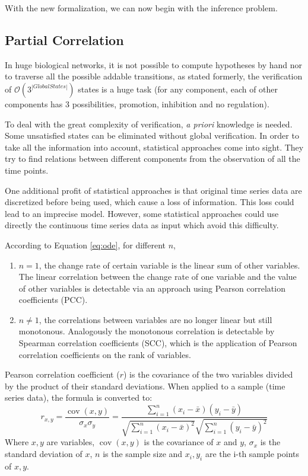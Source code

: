 With the new formalization, we can now begin with the inference problem.


\subsection{Partial Correlation}

In huge biological networks, it is not possible to compute hypotheses by hand nor to traverse all the possible addable transitions, as stated formerly, the verification of $\mathcal{O}(3^{|Global States|})$ states is a huge task (for any component, each of other components has 3 possibilities, promotion, inhibition and no regulation).
 
To deal with the great complexity of verification, \textit{a priori} knowledge is needed. 
Some unsatisfied states can be eliminated without global verification.  
In order to take all the information into account, statistical approaches come into sight.
They try to find relations between different components from the observation of all the time points.

One additional profit of statistical approaches is that original time series data are discretized before being used, which cause a loss of information.
This loss could lead to an imprecise model.
However, some statistical approaches could use directly the continuous time series data as input which avoid this difficulty.

According to Equation \ref{eq:ode}, for different $n$,
\begin{enumerate}
    \item $n=1$, the change rate of certain variable is the linear sum of other variables.
    The linear correlation between the change rate of one variable and the value of other variables is detectable via an approach using Pearson correlation coefficients (PCC).
    \item $n\neq 1$, the correlations between variables are no longer linear but still monotonous.
    Analogously the monotonous correlation is detectable by Spearman correlation coefficients (SCC), which is the application of Pearson correlation coefficients on the rank of variables.
\end{enumerate}

\begin{definition}
    Pearson correlation coefficient ($r$) is the covariance of the two variables divided by the product of their standard deviations.
    When applied to a sample (time series data), the formula is converted to:
    $${\displaystyle r_{x,y}={\frac {\operatorname {cov} (x,y)}{\sigma _{x}\sigma _{y}}}={\frac {\sum _{i=1}^{n}(x_{i}-{\bar {x}})(y_{i}-{\bar {y}})}{{\sqrt {\sum _{i=1}^{n}(x_{i}-{\bar {x}})^{2}}}{\sqrt {\sum _{i=1}^{n}(y_{i}-{\bar {y}})^{2}}}}}}$$
    Where $x,y$ are variables, $\operatorname {cov} (x,y)$ is the covariance of $x$ and $y$, $\sigma _{x}$ is the standard deviation of $x$, $n$ is the sample size and $x_i,y_i$ are the i-th sample points of $x,y$.
\end{definition}

